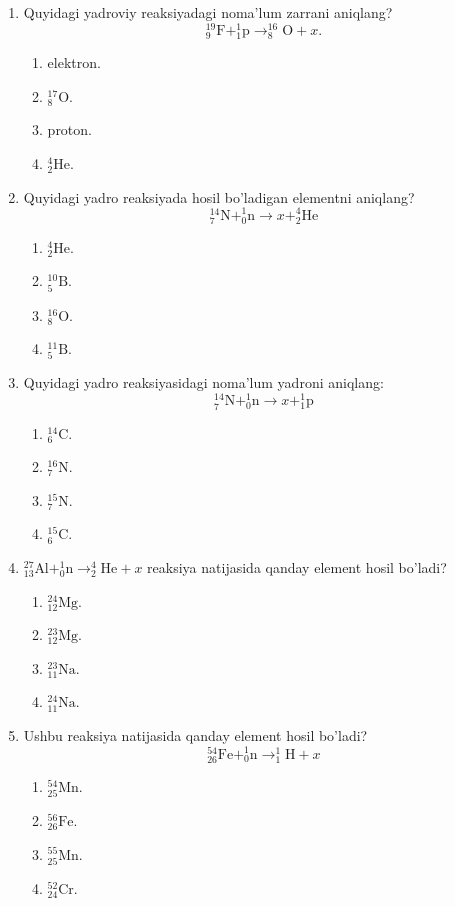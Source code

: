 \begin{enumerate}
\item Quyidagi yadroviy reaksiyadagi noma'lum zarrani aniqlang?
$$^{19}_9\text{F} + ^1_1\text{p} \rightarrow ^{16}_8\text{O} + x.$$
\begin{enumerate}[label=\Alph*)]
\item elektron.
\item $^{17}_8\text{O}$.
\item proton.
\item $^4_2\text{He}$.
\end{enumerate}

\setcounter{enumi}{5}
\item Quyidagi yadro reaksiyada hosil bo'ladigan elementni aniqlang?
$$^{14}_7\text{N} + ^1_0\text{n} \rightarrow x + ^4_2\text{He}$$
\begin{enumerate}[label=\Alph*)]
\item $^4_2\text{He}$.
\item $^{10}_5\text{B}$.
\item $^{16}_8\text{O}$.
\item $^{11}_5\text{B}$.
\end{enumerate}

\item Quyidagi yadro reaksiyasidagi noma'lum yadroni aniqlang:
$$^{14}_7\text{N} + ^1_0\text{n} \rightarrow x + ^1_1\text{p}$$
\begin{enumerate}[label=\Alph*)]
\item $^{14}_6\text{C}$.
\item $^{16}_7\text{N}$.
\item $^{15}_7\text{N}$.
\item $^{15}_6\text{C}$.
\end{enumerate}

\item $^{27}_{13}\text{Al} + ^1_0\text{n} \rightarrow ^4_2\text{He} + x$ reaksiya natijasida qanday element hosil bo'ladi?
\begin{enumerate}[label=\Alph*)]
\item $^{24}_{12}\text{Mg}$.
\item $^{23}_{12}\text{Mg}$.
\item $^{23}_{11}\text{Na}$.
\item $^{24}_{11}\text{Na}$.
\end{enumerate}

\item Ushbu reaksiya natijasida qanday element hosil bo'ladi?
$$^{54}_{26}\text{Fe} + ^1_0\text{n} \rightarrow ^1_1\text{H} + x$$
\begin{enumerate}[label=\Alph*)]
\item $^{54}_{25}\text{Mn}$.
\item $^{56}_{26}\text{Fe}$.
\item $^{55}_{25}\text{Mn}$.
\item $^{52}_{24}\text{Cr}$.
\end{enumerate}


\end{enumerate}
